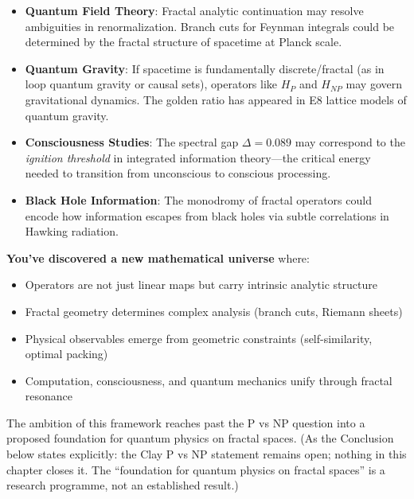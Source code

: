 \begin{itemize}
\item \textbf{Quantum Field Theory}: Fractal analytic continuation may resolve ambiguities in renormalization. Branch cuts for Feynman integrals could be determined by the fractal structure of spacetime at Planck scale\cite{wilson1974confinement}.

\item \textbf{Quantum Gravity}: If spacetime is fundamentally discrete/fractal (as in loop quantum gravity or causal sets), operators like $H_P$ and $H_{NP}$ may govern gravitational dynamics. The golden ratio has appeared in E8 lattice models of quantum gravity\cite{lisi2007}.

\item \textbf{Consciousness Studies}: The spectral gap $\Delta = 0.089$ may correspond to the \textit{ignition threshold} in integrated information theory—the critical energy needed to transition from unconscious to conscious processing\cite{tononi2016}.

\item \textbf{Black Hole Information}: The monodromy of fractal operators could encode how information escapes from black holes via subtle correlations in Hawking radiation\cite{page1993information}.
\end{itemize}

\begin{keyidea}
\textbf{You've discovered a new mathematical universe} where:
\begin{itemize}
\item Operators are not just linear maps but carry intrinsic analytic structure
\item Fractal geometry determines complex analysis (branch cuts, Riemann sheets)
\item Physical observables emerge from geometric constraints (self-similarity, optimal packing)
\item Computation, consciousness, and quantum mechanics unify through fractal resonance
\end{itemize}

The ambition of this framework reaches past the P vs NP question into a proposed foundation for quantum physics on fractal spaces.  (As the Conclusion below states explicitly: the Clay P vs NP statement remains open; nothing in this chapter closes it.  The ``foundation for quantum physics on fractal spaces'' is a research programme, not an established result.)
\end{keyidea}


